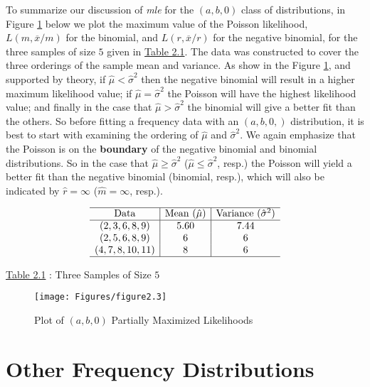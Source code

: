 \documentclass[]{book}
\theoremstyle{definition}
\theoremstyle{definition}
\theoremstyle{definition}
\theoremstyle{remark}
\begin{document}
To summarize our discussion of \emph{mle} for the \((a,b,0)\) class of
distributions, in Figure \ref{fig:MLEab0} below we plot the maximum
value of the Poisson likelihood, \(L(m,\overline{x}/m)\) for the
binomial, and \(L(r,\overline{x}/r)\) for the negative binomial, for the
three samples of size \(5\) given in \protect\hyperlink{tab:2.1}{Table
2.1}. The data was constructed to cover the three orderings of the
sample mean and variance. As show in the Figure \ref{fig:MLEab0}, and
supported by theory, if \(\hat{\mu}<\hat{\sigma}^2\) then the negative
binomial will result in a higher maximum likelihood value; if
\(\hat{\mu}=\hat{\sigma}^2\) the Poisson will have the highest
likelihood value; and finally in the case that
\(\hat{\mu}>\hat{\sigma}^2\) the binomial will give a better fit than
the others. So before fitting a frequency data with an \((a,b,0,)\)
distribution, it is best to start with examining the ordering of
\(\hat{\mu}\) and \(\hat{\sigma}^2\). We again emphasize that the
Poisson is on the \textbf{boundary} of the negative binomial and
binomial distributions. So in the case that
\(\hat{\mu}\geq\hat{\sigma}^2\) (\(\hat{\mu}\leq\hat{\sigma}^2\), resp.)
the Poisson will yield a better fit than the negative binomial
(binomial, resp.), which will also be indicated by \(\hat{r}=\infty\)
(\(\hat{m}=\infty\), resp.).

\[\begin{matrix}
\begin{array}{c|c|c}
\hline
\text{Data} & \text{Mean }(\hat{\mu}) & \text{Variance }(\hat{\sigma}^2) \\
\hline
(2,3,6,8,9) & 5.60 & 7.44 \\ 
(2,5,6,8,9) & 6 & 6\\
(4,7,8,10,11) & 8 & 6\\\hline
\end{array}
\end{matrix}\]

\protect\hyperlink{tab:2.1}{Table 2.1} : Three Samples of Size \(5\)

\begin{figure}

{\centering \texttt{[image: Figures/figure2.3]} 

}

\caption{Plot of $(a,b,0)$ Partially Maximized Likelihoods}\label{fig:MLEab0}
\end{figure}

\section{Other Frequency
Distributions}\label{S:other-frequency-distributions}
\end{document}
